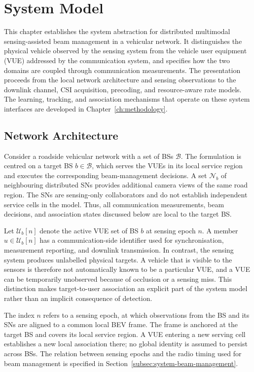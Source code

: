 \chapter{System Model}
\label{ch:system-model}

This chapter establishes the system abstraction for distributed multimodal
sensing-assisted beam management in a vehicular network.  It distinguishes the
physical vehicle observed by the sensing system from the vehicle user equipment
(VUE) addressed by the communication system, and specifies how the two domains
are coupled through communication measurements.  The presentation proceeds from
the local network architecture and sensing observations to the downlink channel,
CSI acquisition, precoding, and resource-aware rate models.  The learning,
tracking, and association mechanisms that operate on these system interfaces are
developed in Chapter~\ref{ch:methodology}.

\section{Network Architecture}
\label{sec:system-network}

Consider a roadside vehicular network with a set of BSs \(\mathcal{B}\).  The
formulation is centred on a target BS \(b\in\mathcal{B}\),
which serves the VUEs in its local service region and executes the corresponding
beam-management decisions.  A set \(\mathcal{N}_b\) of neighbouring distributed
SNs provides additional camera views of the same road region.
The SNs are sensing-only collaborators and do not establish independent service
cells in the model.  Thus, all communication measurements,
beam decisions, and association states discussed below are local to the target
BS.

Let \(\mathcal{U}_b[n]\) denote the active VUE set of BS \(b\) at sensing epoch
\(n\).  A member \(u\in\mathcal{U}_b[n]\) has a communication-side identifier
used for synchronisation, measurement reporting, and downlink transmission.  In
contrast, the sensing system produces unlabelled physical
targets.  A vehicle that is visible to the sensors is therefore not automatically
known to be a particular VUE, and a VUE can be temporarily unobserved because of
occlusion or a sensing miss.  This distinction makes target-to-user association
an explicit part of the system model rather than an implicit consequence of
detection.

The index \(n\) refers to a sensing epoch, at which observations from the BS and
its SNs are aligned to a common local BEV frame.  The frame is
anchored at the target BS and covers its local service region.  A VUE entering a
new serving cell establishes a new local association there; no global identity
is assumed to persist across BSs.  The relation between sensing epochs and the
radio timing used for beam management is specified in
Section~\ref{subsec:system-beam-management}.

